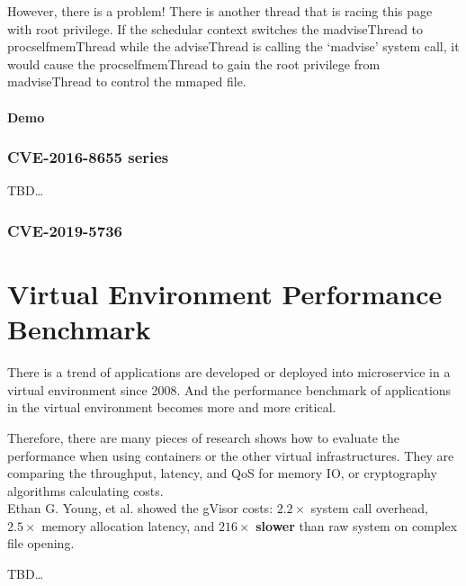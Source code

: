 However, there is a problem! There is another thread that is racing this page with root
privilege. If the schedular context switches the madviseThread to procselfmemThread while
the adviseThread is calling the `madvise' system call, it would cause the
procselfmemThread to gain the root privilege from madviseThread to control the mmaped file.

\paragraph{Demo}
\label{oopmachine}


\subsubsection{CVE-2016-8655 series}
TBD\dots

\subsubsection{CVE-2019-5736}

\section{Virtual Environment Performance Benchmark}
There is a trend of applications are developed or deployed into microservice in a virtual
environment since 2008. And the performance benchmark of applications in the virtual
environment becomes more and more critical.

Therefore, there are many pieces of research shows how to evaluate the performance when
using containers or the other virtual infrastructures\cite{7371699,KOZHIRBAYEV2017175,7095802,234857}.
They are comparing the throughput, latency, and QoS for memory IO, or cryptography
algorithms calculating costs.\\

Ethan G. Young, et al.\cite{234857} showed the gVisor costs: $2.2\times$ system call overhead,
$2.5\times$ memory allocation latency, and $216\times$ \textbf{slower} than raw system on
complex file opening.

TBD\dots
